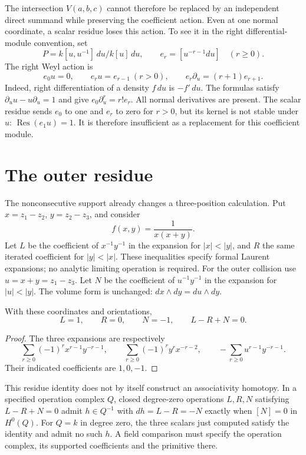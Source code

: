 The intersection \(V(a,b,c)\) cannot therefore be replaced by an
independent direct summand while preserving the coefficient action.
Even at one normal coordinate, a scalar residue loses this action.
To see it in the right differential-module convention, set
\[
 P=k[u,u^{-1}]\,du\big/k[u]\,du,
 \qquad e_r=[u^{-r-1}du]\quad(r\ge0).
\]
The right Weyl action is
\begin{equation}\label{v4-eq:word-normal-derivatives}
 e_0u=0,\qquad e_ru=e_{r-1}\ (r>0),\qquad
 e_r\partial_u=(r+1)e_{r+1}.
\end{equation}
Indeed, right differentiation of a density \(f\,du\) is
\(-f'\,du\). The formulas satisfy
\(\partial_u u-u\partial_u=1\) and give
\(e_0\partial_u^r=r!e_r\). All normal derivatives are present.
The scalar residue sends \(e_0\) to one and \(e_r\) to zero
for \(r>0\), but its kernel is not stable under \(u\):
\(\operatorname{Res}(e_1u)=1\). It is therefore insufficient
as a replacement for this coefficient module.

\section{The outer residue}
\label{v4-sec:word-outer-residue}

The nonconsecutive support already changes a three-position
calculation. Put \(x=z_1-z_2\), \(y=z_2-z_3\), and consider
\[
 f(x,y)=\frac{1}{x(x+y)}.
\]
Let \(L\) be the coefficient of \(x^{-1}y^{-1}\) in the
expansion for \(|x|<|y|\), and \(R\) the same iterated
coefficient for \(|y|<|x|\). These inequalities specify formal
Laurent expansions; no analytic limiting operation is required.
For the outer collision use \(u=x+y=z_1-z_3\). Let \(N\)
be the coefficient of \(u^{-1}y^{-1}\) in the expansion
for \(|u|<|y|\). The volume form is unchanged:
\(dx\wedge dy=du\wedge dy\).

\begin{proposition}\label{v4-prop:word-outer-residue}
With these coordinates and orientations,
\[
 L=1,\qquad R=0,\qquad N=-1,\qquad L-R+N=0.
\]
\end{proposition}

\begin{proof}
The three expansions are respectively
\[
 \sum_{r\ge0}(-1)^r x^{r-1}y^{-r-1},\qquad
 \sum_{r\ge0}(-1)^r y^r x^{-r-2},\qquad
 -\sum_{r\ge0}u^{r-1}y^{-r-1}.
\]
Their indicated coefficients are \(1,0,-1\).
\end{proof}

This residue identity does not by itself construct an associativity
homotopy. In a specified operation complex \(Q\), closed
degree-zero operations \(L,R,N\) satisfying \(L-R+N=0\)
admit \(h\in Q^{-1}\) with \(dh=L-R=-N\) exactly when
\([N]=0\) in \(H^0(Q)\). For \(Q=k\) in degree zero,
the three scalars just computed satisfy the identity and admit
no such \(h\). A field comparison must specify the operation
complex, its supported coefficients and the primitive there.

